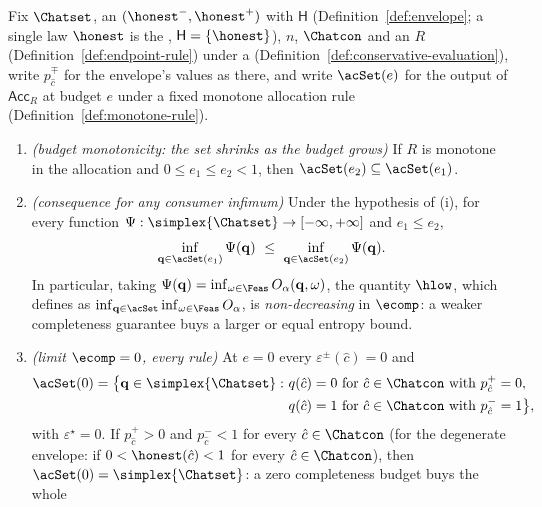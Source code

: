 \begin{theorem}\label{thm:monotonicity-limits}
Fix $\Chatset$, an  $({\honest}^{-},{\honest}^{+})$
with  $\mathsf{H}$ (Definition~\ref{def:envelope}; a single
law $\honest$ is the , $\mathsf{H}=\{\honest\}$),
$n$, $\Chatcon$ and an  $R$
(Definition~\ref{def:endpoint-rule}) under a 
(Definition~\ref{def:conservative-evaluation}), write $p^{\mp}_{\hat c}$ for the
envelope's values as there, and write $\acSet(e)$ for the output of
$\mathsf{Acc}_R$ at budget $e$ under a fixed monotone allocation rule
(Definition~\ref{def:monotone-rule}).
\begin{enumerate}[label=(\roman*),leftmargin=2.2em]
\item \emph{(budget monotonicity: the set shrinks as the budget grows)} If
$R$ is monotone in the allocation and $0\le e_1\le e_2<1$, then
$\acSet(e_2)\subseteq\acSet(e_1)$.
\item \emph{(consequence for any consumer infimum)} Under the hypothesis of
(i), for every function $\Psi:\simplex{\Chatset}\to[-\infty,+\infty]$ and
$e_1\le e_2$,
\begin{equation}\label{eq:inf-mono}
  \inf_{\mathbf{q}\in\acSet(e_1)}\Psi(\mathbf{q})
  \ \le\ \inf_{\mathbf{q}\in\acSet(e_2)}\Psi(\mathbf{q}) .
\end{equation}
In particular, taking
$\Psi(\mathbf{q})=\inf_{\omega\in\Feas}O_{\alpha}(\mathbf{q},\omega)$, the
quantity $\hlow$, which  defines as
$\inf_{\mathbf{q}\in\acSet}\inf_{\omega\in\Feas}O_{\alpha}$, is
\emph{non-decreasing} in $\ecomp$: a weaker completeness guarantee buys a
larger or equal entropy bound.
\item \emph{(limit $\ecomp=0$, every rule)} At $e=0$ every
$\varepsilon^{\pm}(\hat c)=0$ and
\begin{equation*}
\begin{aligned}
  \acSet(0)=\big\{\mathbf{q}\in\simplex{\Chatset}:\
  &q(\hat c)=0\ \text{for }\hat c\in\Chatcon\text{ with }p^{+}_{\hat c}=0,\\
  &q(\hat c)=1\ \text{for }\hat c\in\Chatcon\text{ with }p^{-}_{\hat
  c}=1\big\},
\end{aligned}
\end{equation*}
with $\varepsilon^{\star}=0$. If $p^{+}_{\hat c}>0$ and $p^{-}_{\hat c}<1$ for
every $\hat c\in\Chatcon$ (for the degenerate envelope: if
$0<\honest(\hat c)<1$ for every $\hat c\in\Chatcon$), then
$\acSet(0)=\simplex{\Chatset}$: a zero completeness budget buys the whole

\end{enumerate}
\end{theorem}
